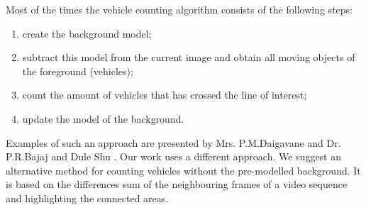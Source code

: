 \documentclass[12pt,a4paper,oneside,titlepage]{article}
\begin{document}
Most of the times the vehicle counting algorithm consists of the following steps:


\begin{enumerate}
  \item create the background model;
  \item subtract this model from the current image and obtain all moving objects of the foreground (vehicles);
  \item count the amount of vehicles that has crossed the line of interest;
  \item update the model of the background.
\end{enumerate}



Examples of such an approach are presented by Mrs. P.M.Daigavane and Dr. P.R.Bajaj \cite{realtime_vehicle_detection} and Dule Shu \cite{vehicle_tracking}.
Our work uses a different approach. We suggest an alternative method for counting vehicles without the pre-modelled background.
It is based on the differences sum  of the neighbouring frames of a video sequence and highlighting the connected areas.



























\newpage
\end{document}
